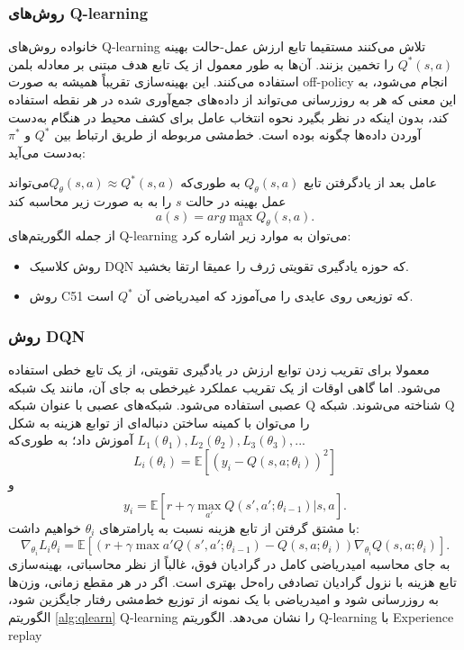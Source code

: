  \subsubsection{روش‌های Q-learning}

خانواده روش‌های  Q-learning تلاش می‌کنند مستقیما تابع ارزش عمل-حالت بهینه $Q^*(s,a)$ را تخمین بزنند. آن‌ها به طور معمول از یک تابع هدف مبتنی بر معادله بلمن استفاده می‌کنند. این بهینه‌سازی تقریباً همیشه به صورت off-policy انجام می‌شود، به این معنی که هر به روزرسانی می‌تواند از داده‌های جمع‌آوری شده در هر نقطه استفاده کند، بدون اینکه در نظر بگیرد نحوه انتخاب عامل برای کشف محیط در هنگام به‌دست آوردن داده‌ها چگونه بوده است. خط‌مشی مربوطه از طریق ارتباط بین 
$Q^*$
و
$\pi^*$
 به‌دست می‌آید: 
 
 عامل بعد از یادگرفتن تابع $Q_\theta(s,a)$ به طوری‌که  $Q_\theta(s,a) \approx Q^*(s,a)$می‌تواند عمل بهینه در حالت $s$ را به به صورت زیر محاسبه کند $$a(s) = arg \max_a Q_{\theta}(s,a).$$
از جمله الگوریتم‌های Q-learning می‌توان به موارد زیر اشاره کرد:
\begin{itemize}
\item روش کلاسیک DQN که حوزه یادگیری تقویتی ژرف را عمیقا ارتقا بخشید.
\item روش C51 که توزیعی روی عایدی را می‌آموزد که امیدریاضی آن $Q^*$ است.
\end{itemize}
\subsubsection{روش DQN}
معمولا برای تقریب زدن توابع ارزش در یادگیری تقویتی، از یک تابع خطی استفاده می‌شود.
اما گاهی اوقات از یک تقریب عملکرد غیرخطی به جای آن، مانند یک شبکه عصبی استفاده می‌شود. شبکه‌های عصبی با عنوان شبکه Q شناخته می‌شوند.
شبکه Q را می‌توان با کمینه ساختن دنباله‌ای از توابع هزینه به شکل 
$L_1(\theta_1), L_2(\theta_2), L_3(\theta_3), ... $ آموزش داد؛ به طوری‌که
$$L_i(\theta_i)=\mathbb{E}\left[(y_i - Q(s,a;\theta_i))^2\right]$$  و  $$y_i = \mathbb{E}[r + \gamma \max_{a'} Q(s',a'; \theta_{i-1})| s,a].$$ با مشتق گرفتن از تابع هزینه نسبت به پارامترهای $\theta_i$  خواهیم داشت: $$\nabla_{\theta_i} L_i{\theta_i} = \mathbb{E}\left[ \left(r + \gamma \max{a'} Q(s',a';\theta_{i-1}) - Q(s,a;\theta_i)\right) \nabla_{\theta_i} Q(s,a;\theta_i)\right].$$
به جای محاسبه امیدریاضی کامل در گرادیان فوق، غالباً از نظر محاسباتی، بهینه‌سازی تابع هزینه با نزول گرادیان تصادفی   راه‌حل بهتری است. اگر در هر مقطع زمانی، وزن‌ها به روزرسانی شود و امیدریاضی با یک نمونه از توزیع خط‌مشی رفتار  جایگزین شود، الگوریتم
\ref{alg:qlearn}
 Q-learning را نشان می‌دهد.
{الگوریتم Q-learning با Experience replay}

